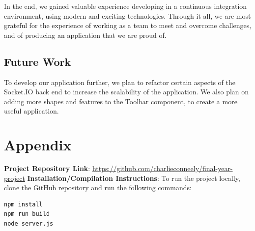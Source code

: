 In the end, we gained valuable experience developing in a continuous integration environment, using modern and exciting technologies. Through it all, we are most grateful for the experience of working as a team to meet and overcome challenges, and of producing an application that we are proud of.   

\section{Future Work} 
To develop our application further, we plan to refactor certain aspects of the Socket.IO back end to increase the scalability of the application. We also plan on adding more shapes and features to the Toolbar component, to create a more useful application.   

\chapter{Appendix}
\textbf{Project Repository Link}: \newline
\url{https://github.com/charlieconneely/final-year-project}\newline \newline
\textbf{Installation/Compilation Instructions}: \newline
To run the project locally, clone the GitHub repository and run the following commands:
\begin{verbatim}
npm install 
npm run build
node server.js
\end{verbatim}


